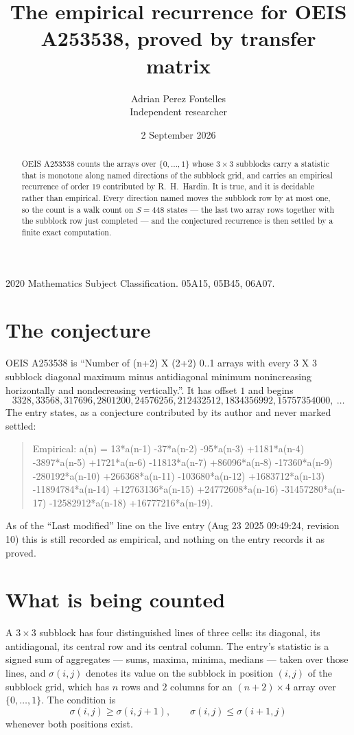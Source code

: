 \documentclass[11pt,a4paper]{article}
\title{The empirical recurrence for OEIS A253538, proved by transfer matrix}
\author{Adrian Perez Fontelles\\ \small Independent researcher}
\date{2 September 2026}
\theoremstyle{plain}
\theoremstyle{definition}
\begin{document}
\maketitle

\begin{abstract}
OEIS A253538 counts the arrays over $\{0,\dots,1\}$ whose $3\times3$ subblocks carry a
statistic that is monotone along named directions of the subblock grid, and carries an
empirical recurrence of order $19$ contributed by R.~H.~Hardin. It is true, and it is
decidable rather than empirical. Every direction named moves the subblock row by at most one,
so the count is a walk count on $S=448$ states --- the last two array rows together with the
subblock row just completed --- and the conjectured recurrence is then settled by a finite
exact computation.
\end{abstract}

\noindent\small 2020 Mathematics Subject Classification. 05A15, 05B45, 06A07.\normalsize

\section{The conjecture}

OEIS A253538 is ``Number of (n+2) X (2+2) 0..1 arrays with every 3 X 3 subblock diagonal maximum minus antidiagonal minimum nonincreasing horizontally and nondecreasing vertically.''. It has offset $1$ and begins
\[
3328, 33568, 317696, 2801200, 24576256, 212432512, 1834356992, 15757354000,\ \dots
\]
The entry states, as a conjecture contributed by its author and never marked settled:
\begin{quote}
Empirical: a(n) = 13*a(n-1) -37*a(n-2) -95*a(n-3) +1181*a(n-4) -3897*a(n-5) +1721*a(n-6) -11813*a(n-7) +86096*a(n-8) -17360*a(n-9) -280192*a(n-10) +266368*a(n-11) -103680*a(n-12) +1683712*a(n-13) -11894784*a(n-14) +12763136*a(n-15) +24772608*a(n-16) -31457280*a(n-17) -12582912*a(n-18) +16777216*a(n-19).
\end{quote}
As of the ``Last modified'' line on the live entry (Aug 23 2025 09:49:24, revision 10) this is still
recorded as empirical, and nothing on the entry records it as proved.

\section{What is being counted}

A $3\times3$ subblock has four distinguished lines of three cells: its diagonal, its
antidiagonal, its central row and its central column. The entry's statistic is a signed sum of
aggregates --- sums, maxima, minima, medians --- taken over those lines, and $\sigma(i,j)$
denotes its value on the subblock in position $(i,j)$ of the subblock grid, which has $n$ rows
and $2$ columns for an $(n+2)\times4$ array over $\{0,\dots,1\}$. The condition is
\[
\sigma(i,j)\ge\sigma(i,j+1),\qquad \sigma(i,j)\le\sigma(i+1,j)
\]
whenever both positions exist.
\end{document}

